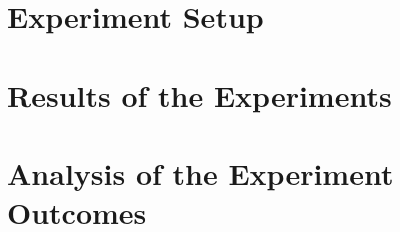 \section{Experiment Setup}
\label{sec:evaluation:setup}

\Blindtext

\section{Results of the Experiments}
\label{sec:evaluation:results}

\Blindtext

\section{Analysis of the Experiment Outcomes}
\label{sec:evaluation:analysis}

\Blindtext
